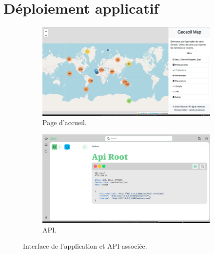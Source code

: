 \documentclass[12pt,a4paper,oneside]{report}
\begin{document}



\chapter{Déploiement applicatif}


\begin{figure}[h]
  \centering
  \begin{subfigure}{0.48\textwidth}
      \centering
      \includegraphics[width=.8\linewidth]{images/app.png}
      \caption{Page d'accueil.}
      \label{fig:app}
  \end{subfigure}
  \hfill
  \begin{subfigure}{0.48\textwidth}
      \centering
      \includegraphics[width=.8\linewidth]{images/api.png}
      \caption{API.}
      \label{fig:api}
  \end{subfigure}
  \caption{Interface de l'application et API associée.}
  \label{fig:app_api}

\end{figure}
\end{document}
